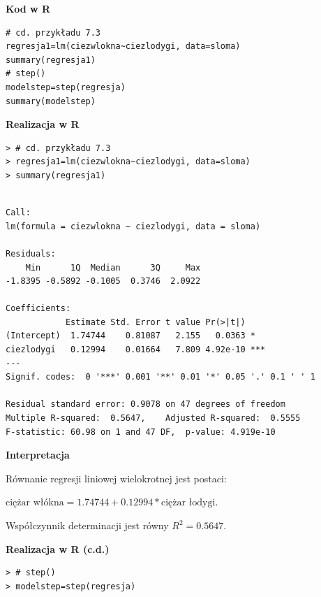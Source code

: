 \documentclass[12pt,B5paper,]{book}
\begin{document}
\vspace{0.8cm} \textbf{Kod w R}

\begin{verbatim}
# cd. przykładu 7.3
regresja1=lm(ciezwlokna~ciezlodygi, data=sloma)
summary(regresja1)
# step()
modelstep=step(regresja)
summary(modelstep)
\end{verbatim}

\vspace{0.8cm} \textbf{Realizacja w R}

\begin{verbatim}
> # cd. przykładu 7.3
> regresja1=lm(ciezwlokna~ciezlodygi, data=sloma)
> summary(regresja1)
\end{verbatim}

\begin{verbatim}

Call:
lm(formula = ciezwlokna ~ ciezlodygi, data = sloma)

Residuals:
    Min      1Q  Median      3Q     Max 
-1.8395 -0.5892 -0.1005  0.3746  2.0922 

Coefficients:
            Estimate Std. Error t value Pr(>|t|)    
(Intercept)  1.74744    0.81087   2.155   0.0363 *  
ciezlodygi   0.12994    0.01664   7.809 4.92e-10 ***
---
Signif. codes:  0 '***' 0.001 '**' 0.01 '*' 0.05 '.' 0.1 ' ' 1

Residual standard error: 0.9078 on 47 degrees of freedom
Multiple R-squared:  0.5647,    Adjusted R-squared:  0.5555 
F-statistic: 60.98 on 1 and 47 DF,  p-value: 4.919e-10
\end{verbatim}

\vspace{0.8cm} \textbf{Interpretacja}

Równanie regresji liniowej wielokrotnej jest postaci:

\(\textrm{ciężar włókna} = 1.74744 + 0.12994*\textrm{ciężar łodygi}\).

Współczynnik determinacji jest równy \(R^2=0.5647\).

\vspace{0.8cm} \textbf{Realizacja w R (c.d.)}

\begin{verbatim}
> # step()
> modelstep=step(regresja)
\end{verbatim}
\end{document}
